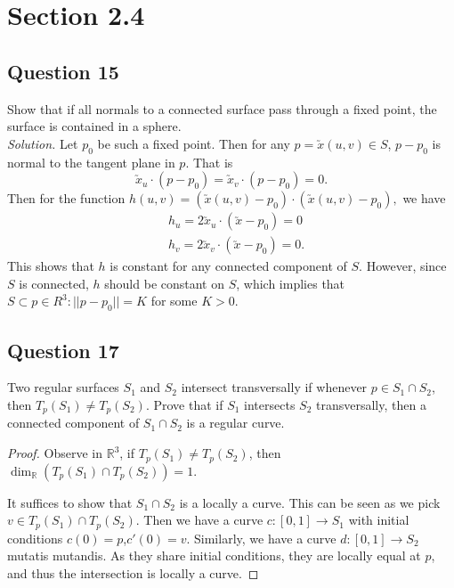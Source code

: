 \documentclass[12pt]{article}
\begin{document}
\section{Section 2.4}

\subsection*{Question 15}
Show that if all normals to a connected surface pass through a fixed point, the surface is contained in a sphere.\\

\textit{Solution.} Let $p_0$ be such a fixed point. Then for any $p = \utilde{x}(u,v)\in S$, $p-p_0$ is normal to the tangent plane in $p$. That is \begin{equation*}
    \utilde{x}_u\cdot (p-p_0) = \utilde{x}_v\cdot (p-p_0) = 0.
\end{equation*}
Then for the function $h(u,v)=(\utilde{x}(u,v)-p_0)\cdot(\utilde{x}(u,v)-p_0),$ we have \begin{align*}
    &h_u = 2\utilde{x}_u\cdot (\utilde{x}-p_0) = 0\\
    &h_v = 2\utilde{x}_v\cdot (\utilde{x}-p_0) = 0.
\end{align*}
This shows that $h$ is constant for any connected component of $S$. However, since $S$ is connected, $h$ should be constant on $S$, which implies that $S\subset {p\in R^3:||p-p_0|| = K}$ for some $K>0$.

\subsection*{Question 17}

Two regular surfaces $S_1$ and $S_2$ intersect transversally if whenever $p \in S_1 \cap S_2$,
then $T_p(S_1) \neq T_p(S_2)$. Prove that if $S_1$ intersects $S_2$ transversally,
then a connected component of $S_1 \cap S_2$ is a regular curve.

\begin{proof}
    Observe in $\mathbb R^3$, if $T_p(S_1) \neq T_p(S_2)$,
    then $\dim_\mathbb{R} (T_p(S_1) \cap T_p(S_2)) = 1.$

    It suffices to show that $S_1 \cap S_2$ is a locally a curve.
    This can be seen as we pick $v \in T_p(S_1)\cap T_p(S_2)$. Then
    we have a curve $c: [0,1] \to S_1$ with initial conditions $c(0) = p$,$c'(0) = v$.
    Similarly, we have a curve $d:[0,1] \to S_2$ mutatis mutandis.
    As they share initial conditions, they are locally equal at $p$, and thus the intersection is locally a curve.
\end{proof}
\end{document}
